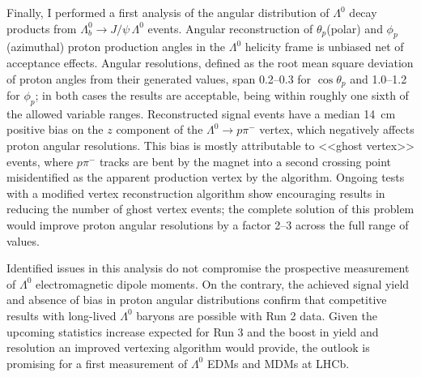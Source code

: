 \documentclass[12pt,a4paper]{book}
\newcommand{\demonstratorshort}{$\Lambda_b^0 \rightarrow J/\psi\,\Lambda^0$\xspace}
\newcommand{\lz}{$\Lambda^0$\xspace}
\newcommand{\lambdadecay}{$\Lambda^0 \rightarrow p\pi^-$\xspace}
\newcommand{\thetap}{$\theta_p$\xspace}
\newcommand{\cthetap}{$\cos\theta_p$\xspace}
\newcommand{\phip}{$\phi_p$\xspace}
\begin{document}
Finally, I performed a first analysis of the angular distribution of \lz decay products from \demonstratorshort events.
Angular reconstruction of \thetap (polar) and \phip (azimuthal) proton production angles in the \lz helicity frame is unbiased net of acceptance effects.
Angular resolutions, defined as the root mean square deviation of proton angles from their generated values, span 0.2--0.3 for \cthetap and 1.0--1.2 for \phip;
in both cases the results are acceptable, being within roughly one sixth of the allowed variable ranges.
Reconstructed signal events have a median \SI{14}{\centi\meter} positive bias on the $z$ component of the \lambdadecay vertex, which negatively affects proton angular resolutions.
This bias is mostly attributable to <<ghost vertex>> events, where $p\pi^-$ tracks are bent by the magnet into a second crossing point misidentified as the apparent production vertex by the algorithm.
Ongoing tests with a modified vertex reconstruction algorithm show encouraging results in reducing the number of ghost vertex events;
the complete solution of this problem would improve proton angular resolutions by a factor 2--3 across the full range of values.

Identified issues in this analysis do not compromise the prospective measurement of \lz electromagnetic dipole moments.
On the contrary, the achieved signal yield and absence of bias in proton angular distributions confirm that competitive results with long-lived \lz baryons are possible with Run 2 data.
Given the upcoming statistics increase expected for Run 3 and the boost in yield and resolution an improved vertexing algorithm would provide, the outlook is promising for a first measurement of \lz EDMs and MDMs at LHCb.


\end{document}

